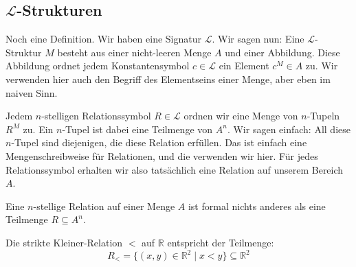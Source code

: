 \subsection{\texorpdfstring{$\mathcal{L}$}{L}-Strukturen}

\begin{spoken-clean}[00:39:40 - 00:41:30]
Noch eine Definition. Wir haben eine Signatur $\mathcal{L}$. Wir sagen nun: Eine $\mathcal{L}$-Struktur $M$ besteht aus einer nicht-leeren Menge $A$ und einer Abbildung. Diese Abbildung ordnet jedem Konstantensymbol $c \in \mathcal{L}$ ein Element $c^M \in A$ zu. Wir verwenden hier auch den Begriff des Elementseins einer Menge, aber eben im naiven Sinn.

Jedem $n$-stelligen Relationssymbol $R \in \mathcal{L}$ ordnen wir eine Menge von $n$-Tupeln $R^M$ zu. Ein $n$-Tupel ist dabei eine Teilmenge von $A^n$. Wir sagen einfach: All diese $n$-Tupel sind diejenigen, die diese Relation erfüllen. Das ist einfach eine Mengenschreibweise für Relationen, und die verwenden wir hier. Für jedes Relationssymbol erhalten wir also tatsächlich eine Relation auf unserem Bereich $A$.
\end{spoken-clean}

\begin{math-stroke}

\begin{remark}
Eine $n$-stellige Relation auf einer Menge $A$ ist formal nichts anderes als eine Teilmenge $R \subseteq A^n$.
\begin{example}
Die strikte Kleiner-Relation $<$ auf $\mathbb{R}$ entspricht der Teilmenge:
\[ R_< = \{ (x, y) \in \mathbb{R}^2 \mid x < y \} \subseteq \mathbb{R}^2 \]
\end{example}
\end{remark}
\end{math-stroke}

